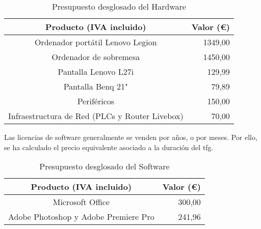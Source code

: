 \vspace{0.5cm}

\begin{table}[ht]
	\centering
	\begin{tabular}{|c|r|}
		\hline
		\rowcolor[HTML]{EFEFEF}
		\textbf{Producto (IVA incluido)}               & \multicolumn{1}{c|}{\cellcolor[HTML]{EFEFEF}\textbf{Valor (€)}} \\ \hline
		Ordenador portátil Lenovo Legion               & 1349,00                                                         \\ \hline
		Ordenador de sobremesa                         & 1450,00                                                         \\ \hline
		Pantalla Lenovo L27i                           & 129,99                                                          \\ \hline
		Pantalla Benq 21"                              & 79,89                                                           \\ \hline
		Periféricos                                    & 150,00                                                          \\ \hline
		Infraestructura de Red (PLCs y Router Livebox) & 70,00                                                           \\ \hline
	\end{tabular}
	\caption{Presupuesto desglosado del Hardware}
	\label{tab:costesHardware}
\end{table}

\vspace{0.5cm}

Las licencias de software generalmente se venden por años, o por meses. Por ello, se ha calculado el precio equivalente asociado a la duración del \gls{tfg}.

\vspace{0.5cm}

\begin{table}[ht]
	\centering
	\begin{tabular}{|c|r|}
		\hline
		\rowcolor[HTML]{EFEFEF}
		\textbf{Producto (IVA incluido)}     & \multicolumn{1}{c|}{\cellcolor[HTML]{EFEFEF}\textbf{Valor (€)}} \\ \hline
		Microsoft Office                     & 300,00                                                          \\ \hline
		Adobe Photoshop y Adobe Premiere Pro & 241,96‬                                                          \\ \hline
	\end{tabular}
	\caption{Presupuesto desglosado del Software}
	\label{tab:costesSoftware}
\end{table}

